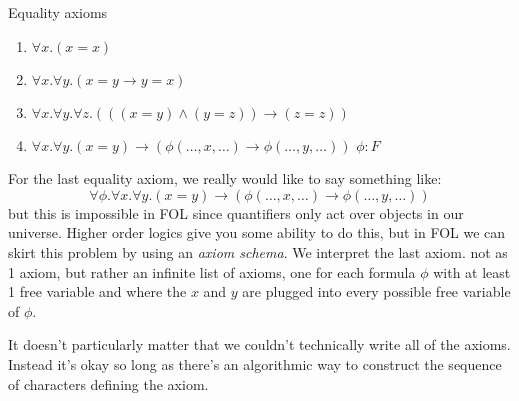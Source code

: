 Equality axioms

\begin{tcolorbox}[colback=green!5!white,colframe=green!75!black,title={\bf Axioms of equality}]
	\begin{enumerate}[itemsep=0pt, label={E.\arabic*}]
		\item $\forall x. (x = x)$ \label{ax:eq-refl}
		\item $\forall x. \forall y. (x=y \to y=x)$ \label{ax:eq-sym}
		\item $\forall x. \forall y. \forall z. (((x=y) \land (y=z)) \to (z=z))$ \label{ax:eq-trans} 
		\item $\forall x. \forall y. (x = y) \to (\phi(\dots,x,\ldots) \to \phi(\ldots,y,\ldots))$ \hfill $\phi:F$
	\end{enumerate}
\end{tcolorbox}

\noindent

For the last equality axiom, we really would like to say something like:
$$\forall \phi. \forall x. \forall y. (x = y) \to (\phi(\dots,x,\ldots) \to \phi(\ldots,y,\ldots))$$
but this is impossible in FOL since quantifiers only act over objects in our universe.
Higher order logics give you some ability to do this, but in FOL we can skirt this problem by using an \emph{axiom schema}.
We interpret the last axiom. not as 1 axiom, but rather an infinite list of axioms, one for each formula $\phi$ with at least 1 free variable and where the $x$ and $y$ are plugged into every possible free variable of $\phi$.

It doesn't particularly matter that we couldn't technically write all of the axioms.
Instead it's okay so long as there's an algorithmic way to construct the sequence of characters defining the axiom.
